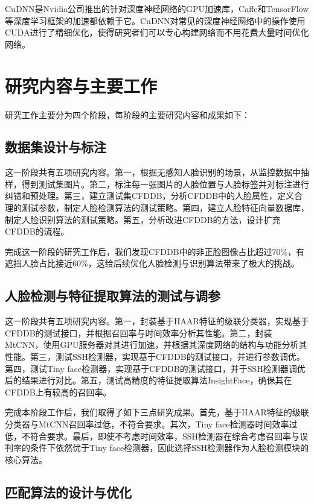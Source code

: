 CuDNN\cite{chetlur2014cudnn}是Nvidia公司推出的针对深度神经网络的GPU加速库，Caffe和TensorFlow等深度学习框架的加速都依赖于它。CuDNN对常见的深度神经网络中的操作使用CUDA进行了精细优化，使得研究者们可以专心构建网络而不用花费大量时间优化网络。

\section{研究内容与主要工作}

研究工作主要分为四个阶段，每阶段的主要研究内容和成果如下：

\subsection{数据集设计与标注}

这一阶段共有五项研究内容。第一，根据无感知人脸识别的场景，从监控数据中抽样，得到测试集图片。第二，标注每一张图片的人脸位置与人脸标签并对标注进行纠错和预处理。第三，建立测试集CFDDB，分析CFDDB中的人脸属性，定义合理的测试参数，制定人脸检测算法的测试策略。第四，建立人脸特征向量数据库，制定人脸识别算法的测试策略。第五，分析改进CFDDB的方法，设计扩充CFDDB的流程。

完成这一阶段的研究工作后，我们发现CFDDB中的非正脸图像占比超过$70\%$，有遮挡人脸占比接近$60\%$，这给后续优化人脸检测与识别算法带来了极大的挑战。

\subsection{人脸检测与特征提取算法的测试与调参}

这一阶段共有五项研究内容。第一，封装基于HAAR特征的级联分类器\cite{viola2004robust}，实现基于CFDDB的测试接口，并根据召回率与时间效率分析其性能。第二，封装MtCNN\cite{zhang2016joint}，使用GPU服务器对其进行加速，并根据其深度网络的结构与功能分析其性能。第三，测试SSH检测器\cite{najibi2017ssh}，实现基于CFDDB的测试接口，并进行参数调优。第四，测试Tiny face检测器\cite{hu2017finding}，实现基于CFDDB的测试接口，并于SSH检测器调优后的结果进行对比。第五，测试高精度的特征提取算法InsightFace\cite{deng2018arcface}，确保其在CFDDB上有较高的召回率。

完成本阶段工作后，我们取得了如下三点研究成果。首先，基于HAAR特征的级联分类器与MtCNN召回率过低，不符合要求。其次，Tiny face检测器时间效率过低，不符合要求。最后，即使不考虑时间效率，SSH检测器在综合考虑召回率与误判率的条件下依然优于Tiny face检测器，因此选择SSH检测器作为人脸检测模块的核心算法。

\subsection{匹配算法的设计与优化}

